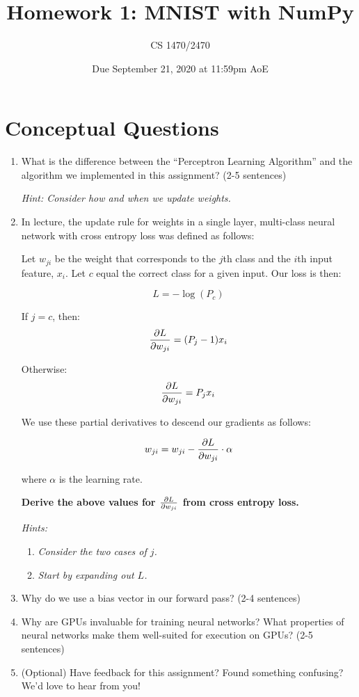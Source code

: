 \documentclass{article}
\title{Homework 1: MNIST with NumPy}
\date{Due September 21, 2020 at 11:59pm AoE}
\author{CS 1470/2470}
\begin{document}
\maketitle

\section{Conceptual Questions}
\begin{enumerate}

  \item What is the difference between the ``Perceptron Learning Algorithm'' and the algorithm we implemented in this assignment? (2-5 sentences) 
  
    \textit{Hint: Consider how and when we update weights.}

    \item In lecture, the update rule for weights in a single layer, multi-class neural network with cross entropy loss was defined as follows:
   
   Let $w_{ji}$ be the weight that corresponds to the $j$th class and the $i$th input feature, $x_i$. Let $c$ equal the correct class for a given input. Our loss is then:
  
       \[L = -\log(P_c) \]

    If $j=c$, then: 
    \[ \pdv{L}{w_{ji}} = (P_j-1)x_i  \]
    
    Otherwise:
        \[ \pdv{L}{w_{ji}} = P_jx_i  \]

    We use these partial derivatives to descend our gradients as follows:    
    
    \[ w_{ji} = w_{ji} -  \pdv{L}{w_{ji}}  \cdot \alpha  \]
    
    where $\alpha$ is the learning rate.

    \textbf{Derive the above values for $\pdv{L}{w_{ji}}$ from cross entropy loss.}
    
    \textit{Hints:}
    \begin{enumerate}
        \item \textit{Consider the two cases of $j$.}
        \item \textit{Start by expanding out $L$.}
        
    \end{enumerate}

    \item Why do we use a bias vector in our forward pass? (2-4 sentences)

    
\item Why are GPUs invaluable for training neural networks? What properties of neural networks make them well-suited for execution on GPUs? (2-5 sentences)

\item (Optional) Have feedback for this assignment? Found something confusing? We'd love to hear from you!



\end{enumerate}
\end{document}
